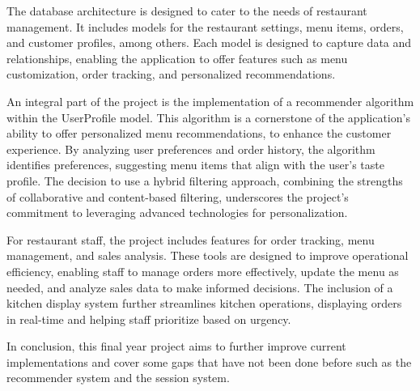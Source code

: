 The database architecture is designed to cater to the needs of restaurant management. It includes models for the restaurant settings, menu items, orders, and customer profiles, among others. Each model is designed to capture data and relationships, enabling the application to offer features such as menu customization, order tracking, and personalized recommendations.

An integral part of the project is the implementation of a recommender algorithm within the UserProfile model. This algorithm is a cornerstone of the application's ability to offer personalized menu recommendations, to enhance the customer experience. By analyzing user preferences and order history, the algorithm identifies preferences, suggesting menu items that align with the user's taste profile. The decision to use a hybrid filtering approach, combining the strengths of collaborative and content-based filtering, underscores the project's commitment to leveraging advanced technologies for personalization.

For restaurant staff, the project includes features for order tracking, menu management, and sales analysis. These tools are designed to improve operational efficiency, enabling staff to manage orders more effectively, update the menu as needed, and analyze sales data to make informed decisions. The inclusion of a kitchen display system further streamlines kitchen operations, displaying orders in real-time and helping staff prioritize based on urgency.

In conclusion, this final year project aims to further improve current implementations and cover some gaps that have not been done before such as the recommender system and the session system.